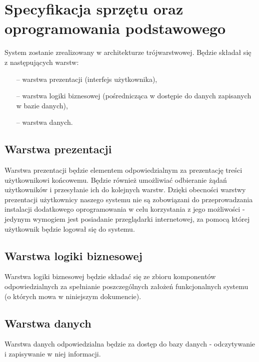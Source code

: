 \section{Specyfikacja sprzętu oraz oprogramowania podstawowego}

System zostanie zrealizowany w architekturze trójwarstwowej. Będzie składał się z następujących warstw:

\begin{itemize}
	\item[--] warstwa prezentacji (interfejs użytkownika),
	\item[--] warstwa logiki biznesowej (pośrednicząca w dostępie do danych zapisanych w bazie danych),
	\item[--] warstwa danych.
\end{itemize}

\subsection{Warstwa prezentacji}

Warstwa prezentacji będzie elementem odpowiedzialnym za prezentację treści użytkownikowi końcowemu. Będzie również umożliwiać odbieranie żądań użytkowników i przesyłanie ich do kolejnych warstw. Dzięki obecności warstwy prezentacji użytkownicy naszego systemu nie są zobowiązani do przeprowadzania instalacji dodatkowego oprogramowania w celu korzystania z jego możliwości - jedynym wymogiem jest posiadanie przeglądarki internetowej, za pomocą której użytkownik będzie logował się do systemu.

\subsection{Warstwa logiki biznesowej}

Warstwa logiki biznesowej będzie składać się ze zbioru komponentów odpowiedzialnych za
spełnianie poszczególnych założeń funkcjonalnych systemu (o których mowa w niniejszym dokumencie).

\subsection{Warstwa danych}

Warstwa danych odpowiedzialna będzie za dostęp do bazy danych - odczytywanie i zapisywanie w niej informacji.

